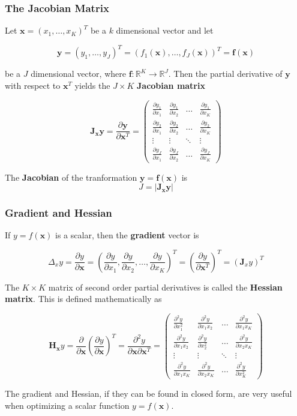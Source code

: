 \documentclass{beamer}
\begin{document}
\begin{frame}
\frametitle{The Jacobian Matrix}
Let $\mathbf{x} = (x_1, \hdots, x_K)^T$ be a $k$ dimensional vector and let 

\[\mathbf{y} = (y_1, \hdots, y_J)^T = (f_1(\mathbf{x}), \hdots, f_J(\mathbf{x}))^T = \mathbf{f}(\mathbf{x})\]

be a $J$ dimensional vector, where $\mathbf{f}: \mathbb{R}^K \rightarrow \mathbb{R}^J$.  Then the partial derivative of $\mathbf{y}$ with respect to $\mathbf{x}^T$ yields the $J \times K$ \textbf{Jacobian matrix}

\[\mathbf{J_xy} = \frac{\partial \mathbf{y}}{\partial \mathbf{x}^T} 
=
\begin{pmatrix}
    \frac{\partial y_1}{\partial x_1} & \frac{\partial y_1}{\partial x_2} & \dots  & \frac{\partial y_1}{\partial x_K} \\
    \frac{\partial y_2}{\partial x_1} & \frac{\partial y_2}{\partial x_2} & \dots  & \frac{\partial y_2}{\partial x_K}\\
    \vdots & \vdots  & \ddots & \vdots \\
    \frac{\partial y_J}{\partial x_1} & \frac{\partial y_J}{\partial x_2} & \dots  & \frac{\partial y_J}{\partial x_K}
\end{pmatrix}
\]

The \textbf{Jacobian} of the tranformation $\mathbf{y} = \mathbf{f(x)}$ is 
$$J = |\mathbf{J_xy}|$$
\end{frame}

\begin{frame}
\frametitle{Gradient and Hessian}
If $y = f(\mathbf{x})$ is a scalar, then the \textbf{gradient} vector is

$$\Delta_xy = \frac{\partial y}{\partial \mathbf{x}} = \left(\frac{\partial y}{\partial x_1}, \frac{\partial y}{\partial x_2}, \hdots, \frac{\partial y}{\partial x_K} \right)^T = \left(\frac{\partial y}{\partial \mathbf{x}^T}\right)^T = (\mathbf{J}_xy)^T$$

The $K \times K$ matrix of second order partial derivatives is called the \textbf{Hessian matrix}.  This is defined mathematically as

$$\mathbf{H}_{\mathbf{x}}y = \frac{\partial }{\partial \mathbf{x}} \left(\frac{\partial y}{\partial \mathbf{x}}\right)^T = \frac{\partial ^2y}{\partial \mathbf{x} \partial \mathbf{x}^T} = 
\begin{pmatrix}
    \frac{\partial ^2 y}{\partial x^2_1} & \frac{\partial ^2y}{\partial x_1 x_2} & \dots  & \frac{\partial ^2y}{\partial x_1 x_K} \\
    \frac{\partial ^2 y}{\partial x_1x_2} & \frac{\partial ^2y}{\partial x^2_2} & \dots  & \frac{\partial ^2y}{\partial x_2 x_K}\\
    \vdots & \vdots  & \ddots & \vdots \\
    \frac{\partial ^2y}{\partial x_1 x_K} & \frac{\partial ^2y}{\partial x_2 x_K} & \dots  & \frac{\partial ^2y}{\partial x^2_K}
\end{pmatrix}
$$

The gradient and Hessian, if they can be found in closed form, are very useful when optimizing a scalar function $y = f(\mathbf{x})$. 
\end{frame}
\end{document}
